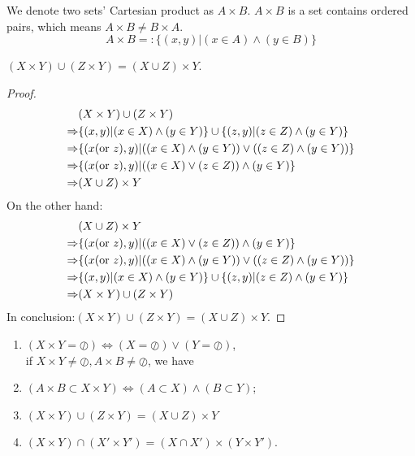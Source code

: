 We denote two sets' Cartesian product as $A \times B $.
$A\times B$ is a set contains ordered pairs, which means $A\times B\neq B\times A$.
\[A\times B=:\{(x,y)|(x\in A)\wedge(y\in B)\}\]
\begin{question}
    $(X\times Y)\cup (Z\times Y)=(X\cup Z)\times Y$.
\end{question}
\begin{proof}
    \[\begin{aligned}
        &(X\times Y)\cup (Z\times Y)\\\Rightarrow&\{(x,y)|(x\in X)\wedge(y\in Y)\}\cup \{(z,y)|(z\in Z)\wedge(y\in Y)\}\\\Rightarrow&\{(x ({\rm or}\ z),y)|((x\in X)\wedge(y\in Y))\vee((z\in Z)\wedge(y\in Y))\}\\\Rightarrow&\{(x ({\rm or}\ z),y)|((x\in X)\vee (z\in Z))\wedge(y\in Y)\}\\\Rightarrow&(X\cup Z)\times Y
    \end{aligned}\]
    On the other hand:
    \[\begin{aligned}
        &(X\cup Z)\times Y\\\Rightarrow&\{(x ({\rm or}\ z),y)|((x\in X)\vee (z\in Z))\wedge(y\in Y)\}\\\Rightarrow&\{(x ({\rm or}\ z),y)|((x\in X)\wedge(y\in Y))\vee((z\in Z)\wedge(y\in Y))\}\\\Rightarrow&\{(x,y)|(x\in X)\wedge(y\in Y)\}\cup \{(z,y)|(z\in Z)\wedge(y\in Y)\}\\\Rightarrow&(X\times Y)\cup (Z\times Y)
    \end{aligned}\]
    In conclusion:$(X\times Y)\cup (Z\times Y)=(X\cup Z)\times Y$.
\end{proof}
\begin{tips}
    \begin{enumerate}
        \item $(X\times Y=\oslash)\Leftrightarrow(X=\oslash)\vee(Y=\oslash)$,\\if $X\times Y\neq \oslash, A\times B\neq \oslash$, {\rm we have}
        \item $(A\times B\subset X\times Y)\Leftrightarrow(A\subset X)\wedge(B\subset Y)$;
        \item $(X\times Y)\cup (Z\times Y)=(X\cup Z)\times Y$
        \item $(X\times Y)\cap (X'\times Y')=(X\cap X')\times (Y\times Y')$.
    \end{enumerate}
\end{tips}